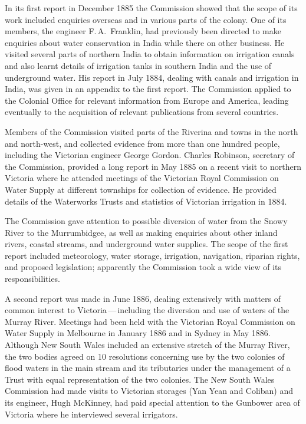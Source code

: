 In its first report in December 1885 the Commission showed that the
scope of its work included enquiries overseas and in various parts of
the colony.  One of its members, the engineer F.\,A.~Franklin,
 had
previously been directed to make enquiries about water conservation in
India while there on other business.  He visited several parts of
northern India to obtain information on irrigation canals and also
learnt details of irrigation tanks in southern India and the use of
underground water.  His report in July 1884, dealing with canals and
irrigation in India,  was given in an appendix to the
first report.  The Commission applied to the Colonial Office for
relevant information from Europe and America, leading eventually to
the acquisition of relevant publications from several
countries.

Members of the Commission visited parts of the Riverina and towns in
the north and north-west, and collected evidence from more than one
hundred people, including the Victorian engineer George
Gordon.   Charles Robinson, 
secretary of the Commission, provided a long report in May 1885 on a
recent visit to northern Victoria where he attended meetings of the
Victorian Royal Commission on Water Supply at different townships for
collection of evidence. He provided details of the Waterworks Trusts
and statistics of Victorian irrigation in 1884.

The Commission gave attention to possible diversion of water from the
Snowy River  to the Murrumbidgee,
 as well as making
enquiries about other inland rivers, coastal streams, and underground
water supplies.  The scope of the first report included meteorology,
water storage, irrigation, navigation, riparian rights, and proposed
legislation; apparently the Commission took a wide view of its
responsibilities.

A second report was made in June 1886, dealing extensively with
matters of common interest to Victoria\,---\,including the diversion
and use of waters of the Murray River.   Meetings
had been held with the Victorian Royal Commission on Water Supply in
Melbourne in January 1886 and in Sydney in May 1886.  Although New
South Wales included an extensive stretch of the Murray River, the two
bodies agreed on 10 resolutions concerning use by the two colonies of
flood waters in the main stream and its tributaries under the
management of a Trust with equal representation of the two colonies.
The New South Wales Commission had made visits to Victorian storages
(Yan Yean and Coliban) 
 and its engineer, Hugh McKinney,
 had paid special attention to the Gunbower area 
of Victoria where he interviewed several irrigators.

